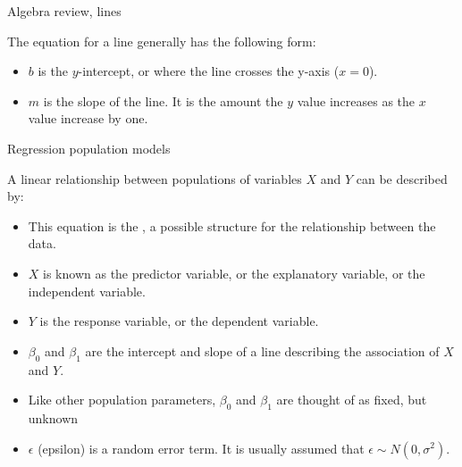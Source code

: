 \documentclass[xcolor=table, aspectratio=169, bigger]{beamer}
\begin{document}
\begin{frame}{Algebra review, lines}
\begin{block}{}
The equation for a line generally has the following form:\\
\smallskip
{}
\begin{itemize}
\item $b$ is the $y$-intercept, or where the line crosses the y-axis ($x=0$).
\item $m$ is the slope of the line. It is the amount the $y$ value increases as the $x$ value increase by one.
\end{itemize}
\end{block}
\end{frame}

\begin{frame}{Regression population models}
\begin{block}{}
A linear relationship between populations of variables $X$ and $Y$ can be described by:\\
\smallskip
{}
\smallskip
\begin{itemize}
\pause\item This equation is the , a possible structure for the relationship between the data.
\pause\item $X$ is known as the predictor variable, or the explanatory variable, or the independent variable.
\pause\item $Y$ is the response variable, or the dependent variable.
\pause\item $\beta_0$ and $\beta_1$ are the intercept and slope of a line describing the association of $X$ and $Y$.
\pause\item Like other population parameters, $\beta_0$ and $\beta_1$ are thought of as fixed, but unknown
\pause\item $\epsilon$ (epsilon) is a random error term. It is usually assumed that $\epsilon \sim N(0, \sigma^2)$.
\end{itemize}
\end{block}
\end{frame}
\end{document}
